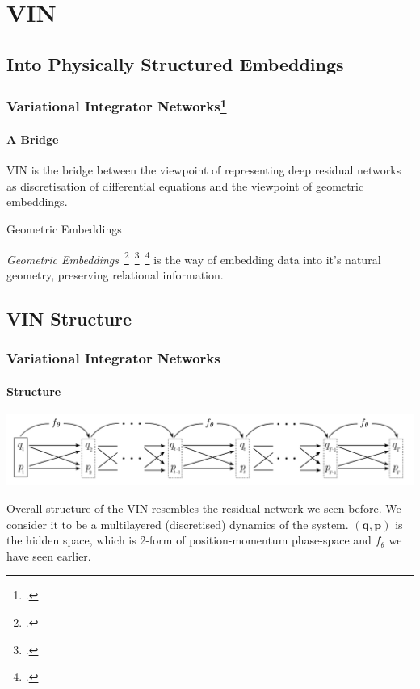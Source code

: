 \documentclass[
    11pt, %
    aspectratio=169, ]{beamer}%
\begin{document}
\section{VIN}

\subsection{Into Physically Structured Embeddings}

\begin{frame}
    \frametitle{Variational Integrator Networks\footcite{saemundssonVariationalIntegratorNetworks2020}}
    \framesubtitle{A Bridge}

    VIN is the bridge between the viewpoint of representing deep residual networks
    as discretisation of differential equations and the viewpoint of geometric
    embeddings.

    \begin{block}{Geometric Embeddings}

        \textit{Geometric Embeddings}~\footcite{chamberlainNeuralEmbeddingsGraphs2017}~\footcite{davidsonHypersphericalVariationalAutoEncoders2022}~\footcite{xiongGeometricRelationalEmbeddings2023} is the way of embedding data into it's natural geometry, preserving relational information.

    \end{block}

\end{frame}

\subsection{VIN Structure}

\begin{frame}
    \frametitle{Variational Integrator Networks}
    \framesubtitle{Structure}

    \includegraphics[width=15cm]{assets/deep-vin.png}

    Overall structure of the VIN resembles the residual network we seen before. We
    consider it to be a multilayered (discretised) dynamics of the system.
    \((\mathbf{q}, \mathbf{p})\) is the hidden space, which is 2-form of
    position-momentum phase-space and \(f_\theta\) we have seen earlier.

\end{frame}
\end{document}
